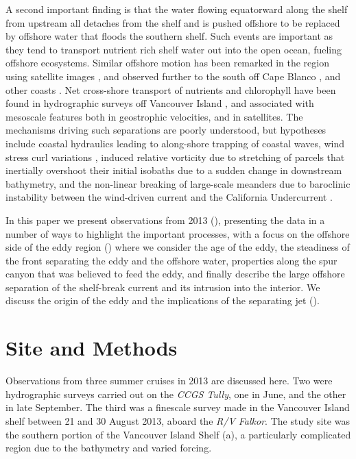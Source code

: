 \documentclass[draft]{agujournal2019}
\begin{document}
A second important finding is that the water flowing equatorward along the shelf from upstream all detaches from the shelf and is pushed offshore to be replaced by offshore water that floods the southern shelf.  Such events are important as they tend to transport nutrient rich shelf water out into the open ocean, fueling offshore ecosystems.  Similar offshore motion has been remarked in the region using satellite images \cite{ikedaemery84,thomsongower98}, and observed further to the south off Cape Blanco \cite{barthetal00}, and other coasts \cite[e.g.]{relvasbarton05}. Net cross-shore transport of nutrients and chlorophyll have been found in hydrographic surveys off Vancouver Island \cite{mackasyelland99}, and associated with mesoscale features both in geostrophic velocities, and in satellites.  The mechanisms driving such separations are poorly understood, but hypotheses include coastal hydraulics \cite{dalebarth01} leading to along-shore trapping of coastal waves,  wind stress curl variations \cite{castelaobarth07}, induced relative vorticity due to stretching of parcels that inertially overshoot their initial isobaths due to a sudden change in downstream bathymetry, and the non-linear breaking of large-scale meanders due to baroclinic instability between the wind-driven current and the California Undercurrent \cite{ikedaetal84, batteen97}.

In this paper we present  observations from 2013 (), presenting the data in a number of ways to highlight the important processes, with a focus on the offshore side of the eddy region () where we consider the age of the eddy, the steadiness of the front separating the eddy and the offshore water, properties along the spur canyon that was believed to feed the eddy, and finally describe the large offshore separation of the shelf-break current and its intrusion into the interior.  We discuss the origin of the eddy and the implications of the separating jet ().

\section{Site and Methods}
\label{sec:Site}

Observations from three summer cruises in 2013 are discussed here. Two were hydrographic surveys carried out on the \emph{CCGS Tully}, one in June, and the other in late September.  The third was a finescale survey made in the Vancouver Island shelf between 21 and 30 August 2013, aboard the \emph{R/V Falkor}.  The study site was the southern portion of the Vancouver Island Shelf (a), a particularly complicated region due to the bathymetry and varied forcing.
\end{document}
